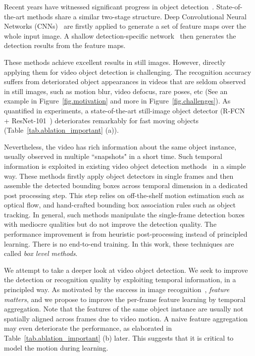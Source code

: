 \documentclass[10pt,twocolumn,letterpaper]{article}
\begin{document}
Recent years have witnessed significant progress in object detection~\cite{girshick2014rich}. State-of-the-art methods share a similar two-stage structure. Deep Convolutional Neural Networks (CNNs)~\cite{krizhevsky2012imagenet,simonyan2015very,szegedy2015going,he2016deep} are firstly applied to generate a set of feature maps over the whole input image. A shallow detection-specific network~\cite{he2014spatial,girshick2015fast,ren2015faster,liu2016ssd,dai2016rfcn} then generates the detection results from the feature maps.

These methods achieve excellent results in still images. However, directly applying them for video object detection is challenging. The recognition accuracy suffers from deteriorated object appearances in videos that are seldom observed in still images, such as motion blur, video defocus, rare poses, etc (See an example in Figure~\ref{fig.motivation} and more in Figure~\ref{fig.challenges}). As quantified in experiments, a state-of-the-art still-image object detector (R-FCN~\cite{dai2016rfcn} + ResNet-101~\cite{he2016deep}) deteriorates remarkably for fast moving objects (Table~\ref{tab.ablation_important} (a)).

Nevertheless, the video has rich information about the same object instance, usually observed in multiple ``snapshots" in a short time. Such temporal information is exploited in existing video object detection methods~\cite{kang2016tcnn,kang2016object,han2016seqnms,lee2016multi} in a simple way. These methods firstly apply object detectors in single frames and then assemble the detected bounding boxes across temporal dimension in a dedicated post processing step. This step relies on off-the-shelf motion estimation such as optical flow, and hand-crafted bounding box association rules such as object tracking. In general, such methods manipulate the single-frame detection boxes with mediocre qualities but do not improve the detection quality. The performance improvement is from heuristic post-processing instead of principled learning. There is no end-to-end training. In this work, these techniques are called \emph{box level methods}.

We attempt to take a deeper look at video object detection. We seek to improve the detection or recognition quality by exploiting temporal information, in a principled way. As motivated by the success in image recognition~\cite{girshick2014rich}, \emph{feature matters}, and we propose to improve the per-frame feature learning by temporal aggregation. Note that the features of the same object instance are usually not spatially aligned across frames due to video motion. A naive feature aggregation may even deteriorate the performance, as elaborated in Table~\ref{tab.ablation_important} (b) later. This suggests that it is critical to model the motion during learning.
\end{document}
